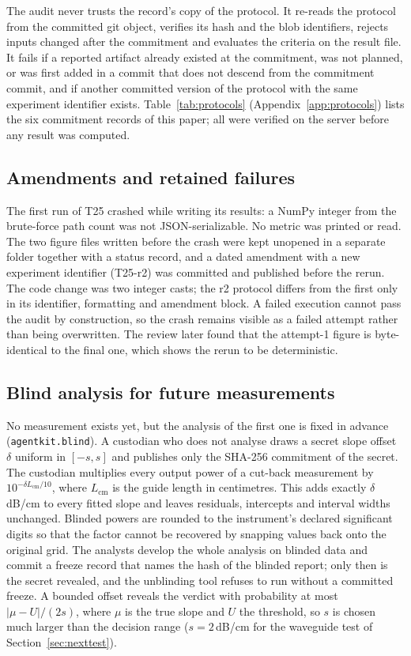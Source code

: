 \documentclass[11pt,a4paper]{article}
\newcommand{\dBcm}{\,dB/cm\xspace}
\begin{document}
The audit never trusts the record's copy of the protocol. It re-reads the protocol from the committed git object, verifies its hash and the blob identifiers, rejects inputs changed after the commitment and evaluates the criteria on the result file. It fails if a reported artifact already existed at the commitment, was not planned, or was first added in a commit that does not descend from the commitment commit, and if another committed version of the protocol with the same experiment identifier exists. Table~\ref{tab:protocols} (Appendix~\ref{app:protocols}) lists the six commitment records of this paper; all were verified on the server before any result was computed.

\subsection{Amendments and retained failures}

The first run of T25 crashed while writing its results: a NumPy integer from the brute-force path count was not JSON-serializable. No metric was printed or read. The two figure files written before the crash were kept unopened in a separate folder together with a status record, and a dated amendment with a new experiment identifier (T25-r2) was committed and published before the rerun. The code change was two integer casts; the r2 protocol differs from the first only in its identifier, formatting and amendment block. A failed execution cannot pass the audit by construction, so the crash remains visible as a failed attempt rather than being overwritten. The review later found that the attempt-1 figure is byte-identical to the final one, which shows the rerun to be deterministic.

\subsection{Blind analysis for future measurements}

No measurement exists yet, but the analysis of the first one is fixed in advance (\texttt{agentkit.blind}). A custodian who does not analyse draws a secret slope offset $\delta$ uniform in $[-s,s]$ and publishes only the SHA-256 commitment of the secret. The custodian multiplies every output power of a cut-back measurement by $10^{-\delta L_\mathrm{cm}/10}$, where $L_\mathrm{cm}$ is the guide length in centimetres. This adds exactly $\delta$\dBcm to every fitted slope and leaves residuals, intercepts and interval widths unchanged. Blinded powers are rounded to the instrument's declared significant digits so that the factor cannot be recovered by snapping values back onto the original grid. The analysts develop the whole analysis on blinded data and commit a freeze record that names the hash of the blinded report; only then is the secret revealed, and the unblinding tool refuses to run without a committed freeze. A bounded offset reveals the verdict with probability at most $|\mu-U|/(2s)$, where $\mu$ is the true slope and $U$ the threshold, so $s$ is chosen much larger than the decision range ($s=2$\dBcm for the waveguide test of Section~\ref{sec:nexttest}).
\end{document}
